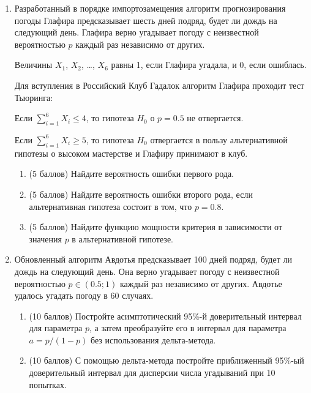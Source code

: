 \begin{enumerate}
	\item Разработанный в порядке импортозамещения алгоритм прогнозирования погоды Глафира предсказывает шесть дней подряд, будет ли дождь на следующий день. Глафира верно угадывает погоду с неизвестной вероятностью $p$ каждый раз независимо от других.
	
	Величины $X_1$, $X_2$, \ldots, $X_6$ равны 1, если Глафира угадала, и 0, если ошиблась. 
	
	Для вступления в Российский Клуб Гадалок алгоритм Глафира проходит тест Тьюринга:
	
	Если $\sum_{i=1}^6 X_i \leq 4$, то гипотеза $H_0$ о $p=0.5$ не отвергается. 
	
	Если $\sum_{i=1}^6 X_i \geq 5$, то гипотеза $H_0$ отвергается в пользу альтернативной гипотезы о высоком мастерстве и Глафиру принимают в клуб.
	
	\begin{enumerate}
		\item (5 баллов) Найдите вероятность ошибки первого рода.
		\item (5 баллов) Найдите вероятность ошибки второго рода,
		если альтернативная гипотеза состоит в том, что $p=0.8$.
		\item (5 баллов) Найдите функцию мощности критерия в зависимости от значения $p$ в альтернативной гипотезе. 
	\end{enumerate}
	
	\item Обновленный алгоритм Авдотья предсказывает 100 дней подряд, будет ли дождь на следующий день. Она верно угадывает погоду с неизвестной вероятностью $p \in (0.5; 1)$ каждый раз независимо от других. 
	Авдотье удалось угадать погоду в 60 случаях. 
	
	
	\begin{enumerate}
	\item (10 баллов) Постройте асимптотический 95\%-й доверительный интервал для параметра $p$, а затем преобразуйте его в интервал для параметра $a= p/(1-p)$ без использования дельта-метода.
	\item (10 баллов) С помощью дельта-метода постройте приближенный 95\%-ый доверительный интервал для дисперсии числа угадываний при 10 попытках.
	\end{enumerate}
	
	
	

\end{enumerate}
